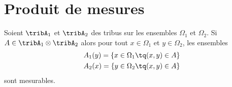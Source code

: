 \section{Produit de mesures}

\begin{lemma} \label{LemAQmWEmN}
    Soient \( \tribA_1\) et \( \tribA_2\) des tribus sur les ensembles \( \Omega_1\) et \( \Omega_2\). Si \( A\in\tribA_1\otimes\tribA_2\) alors pour tout \( x\in \Omega_1\) et \( y\in\Omega_2\), les ensembles
    \begin{subequations}    \label{subEqCTtPccK}
        \begin{align}
            A_1(y)=\{ x\in\Omega_1\tq (x,y)\in A \}\\
            A_2(x)=\{ y\in\Omega_2\tq (x,y)\in A \}
        \end{align}
    \end{subequations}
    sont mesurables.
\end{lemma}


